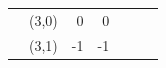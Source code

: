 \documentclass[11pt, letterpaper, shortlabels]{berkeley}
\newcommand{\xmark}{\textcolor{red!70!black}{\ding{55}}}   %
\begin{document}
{\begin{table}[!htbp]
\begin{minipage}[t]{0.48\textwidth}
\begin{tabular}{ccrrccc}
 & (3,0) & 0  & 0  & \xmark & & \\
 & (3,1) & -1 & -1 & \xmark & & \\
\bottomrule
\end{tabular}
\end{minipage}
\end{table}

 


}
\end{document}
